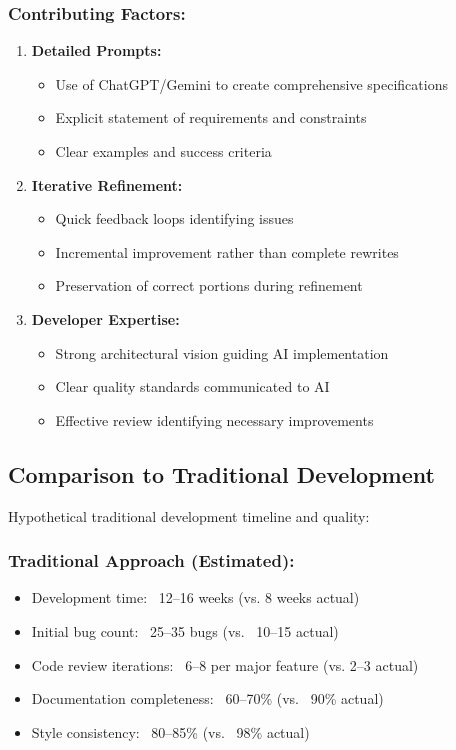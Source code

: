 \documentclass[12pt,a4paper]{article}
\begin{document}
\subsubsection*{Contributing Factors:}

\begin{enumerate}
    \item \textbf{Detailed Prompts:}
    \begin{itemize}
        \item Use of ChatGPT/Gemini to create comprehensive specifications
        \item Explicit statement of requirements and constraints
        \item Clear examples and success criteria
    \end{itemize}
    
    \item \textbf{Iterative Refinement:}
    \begin{itemize}
        \item Quick feedback loops identifying issues
        \item Incremental improvement rather than complete rewrites
        \item Preservation of correct portions during refinement
    \end{itemize}
    
    \item \textbf{Developer Expertise:}
    \begin{itemize}
        \item Strong architectural vision guiding AI implementation
        \item Clear quality standards communicated to AI
        \item Effective review identifying necessary improvements
    \end{itemize}
\end{enumerate}

\subsection{Comparison to Traditional Development}

Hypothetical traditional development timeline and quality:

\subsubsection*{Traditional Approach (Estimated):}
\begin{itemize}
    \item Development time: ~12--16 weeks (vs. 8 weeks actual)
    \item Initial bug count: ~25--35 bugs (vs. ~10--15 actual)
    \item Code review iterations: ~6--8 per major feature (vs. 2--3 actual)
    \item Documentation completeness: ~60--70\% (vs. ~90\% actual)
    \item Style consistency: ~80--85\% (vs. ~98\% actual)
\end{itemize}
\end{document}
